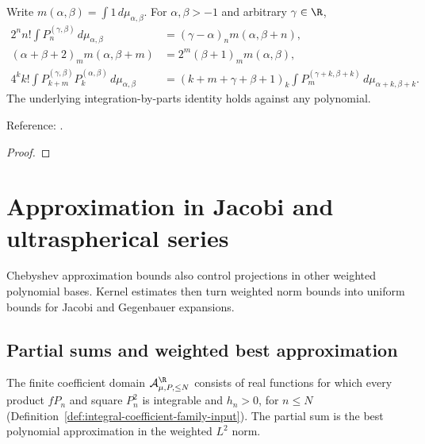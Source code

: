 \begin{supporting}
\begin{theorem}
\label{thm:jacobi-mixed-moments}
\leanok
Write $m(\alpha,\beta)=\int1\,d\mu_{\alpha,\beta}$.
For $\alpha,\beta>-1$ and arbitrary $\gamma\in\R$,
\begin{align*}
 2^n n!\int P_n^{(\gamma,\beta)}\,d\mu_{\alpha,\beta}
   &=(\gamma-\alpha)_n m(\alpha,\beta+n),\\
 (\alpha+\beta+2)_m m(\alpha,\beta+m)
   &=2^m(\beta+1)_m m(\alpha,\beta),\\
 4^k k!\int P_{k+m}^{(\gamma,\beta)}P_k^{(\alpha,\beta)}\,d\mu_{\alpha,\beta}
   &=(k+m+\gamma+\beta+1)_k
     \int P_m^{(\gamma+k,\beta+k)}\,d\mu_{\alpha+k,\beta+k}.
\end{align*}
The underlying integration-by-parts identity holds against any polynomial.

Reference: \cite[18.18.14]{dlmf}.
\end{theorem}
\begin{proof}
\leanok
\end{proof}

\end{supporting}

\chapter{Approximation in Jacobi and ultraspherical series}\label{chap:jacobi-approx}


Chebyshev approximation bounds also control projections in other weighted polynomial bases. Kernel estimates then turn weighted norm bounds into uniform bounds for Jacobi and Gegenbauer expansions.

\section{Partial sums and weighted best approximation}\label{sec:textbook-jacobi-approx-projection}

The finite coefficient domain $\mathcal A_{\mu,P,\le N}^{\R}$ consists of real functions for which every product $fP_n$ and square $P_n^2$ is integrable and $h_n>0$, for $n\le N$ (Definition~\ref{def:integral-coefficient-family-input}). The partial sum is the best polynomial approximation in the weighted $L^2$ norm.

